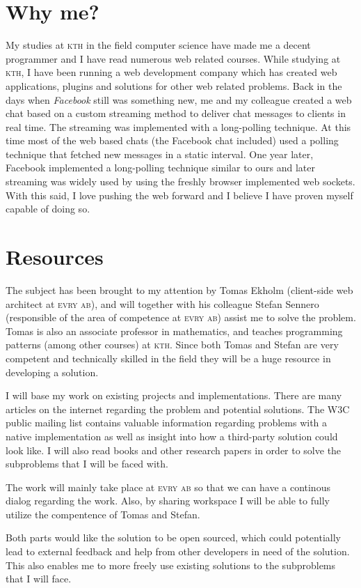 \documentclass[oneside,a4paper,11pt]{kth-mag}
\begin{document}
\section*{Why me?}
My studies at \textsc{kth} in the field computer science have made me a decent programmer and I have read numerous web related courses. While studying at \textsc{kth}, I have been running a web development company which has created web applications, plugins and solutions for other web related problems. Back in the days when \emph{Facebook} still was something new, me and my colleague created a web chat based on a custom streaming method to deliver chat messages to clients in real time. The streaming was implemented with a long-polling technique. At this time most of the web based chats (the Facebook chat included) used a polling technique that fetched new messages in a static interval. One year later, Facebook implemented a long-polling technique similar to ours and later streaming was widely used by using the freshly browser implemented web sockets. With this said, I love pushing the web forward and I believe I have proven myself capable of doing so.

\section*{Resources}
The subject has been brought to my attention by Tomas Ekholm (client-side web architect at \textsc{evry ab}), and will together with his colleague Stefan Sennero (responsible of the area of competence at \textsc{evry ab}) assist me to solve the problem. Tomas is also an associate professor in mathematics, and teaches programming patterns (among other courses) at \textsc{kth}. Since both Tomas and Stefan are very competent and technically skilled in the field they will be a huge resource in developing a solution.

I will base my work on existing projects and implementations. There are many articles on the internet regarding the problem and potential solutions. The W3C public mailing list contains valuable information regarding problems with a native implementation as well as insight into how a third-party solution could look like. I will also read books and other research papers in order to solve the subproblems that I will be faced with.

The work will mainly take place at \textsc{evry ab} so that we can have a continous dialog regarding the work. Also, by sharing workspace I will be able to fully utilize the compentence of Tomas and Stefan.

Both parts would like the solution to be open sourced, which could potentially lead to external feedback and help from other developers in need of the solution. This also enables me to more freely use existing solutions to the subproblems that I will face.
\end{document}
